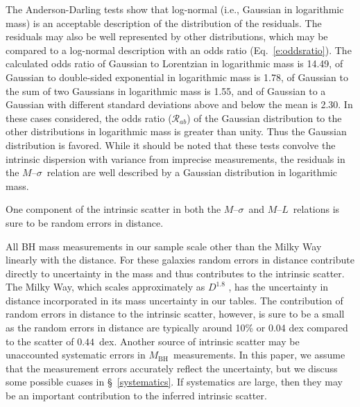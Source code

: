 \documentclass[twosided,letterpaper,numberedappendix]{emulateapj}
\newcommand{\msigma}   {\ensuremath{M}{--}\ensuremath{\sigma}}
\newcommand{\ml}       {\ensuremath{M}{--}\ensuremath{L}}
\newcommand{\mbh}      {\ensuremath{M_{\mathrm{BH}}}}
\newcommand{\msscat} {\ensuremath{0.44}}
\begin{document}
The Anderson-Darling tests show that log-normal (i.e., Gaussian in
logarithmic mass) is an acceptable description of the distribution of
the residuals.  The residuals may also be well represented by other
distributions, which may be compared to a log-normal description with
an odds ratio (Eq.~\ref{e:oddsratio}).  The calculated odds ratio of
Gaussian to Lorentzian in logarithmic mass is 14.49, of Gaussian to
double-sided exponential in logarithmic mass is 1.78, of Gaussian to
the sum of two Gaussians in logarithmic mass is 1.55, and of Gaussian
to a Gaussian with different standard deviations above and below the
mean is 2.30.  In these cases considered, the odds ratio (${\mathcal
R}_{ab}$) of the Gaussian distribution to the other distributions in
logarithmic mass is greater than unity.  Thus the Gaussian
distribution is favored.  While it should be noted that these tests
convolve the intrinsic dispersion with variance from imprecise
measurements, the residuals in the \msigma\ relation are well
described by a Gaussian distribution in logarithmic mass.

One component of the intrinsic scatter in both the \msigma\ and \ml\
relations is sure to be random errors in distance.  

All BH mass measurements in our sample scale other than the Milky Way
linearly with the distance.  For these galaxies random errors in
distance contribute directly to uncertainty in the mass and thus
contributes to the intrinsic scatter.  The Milky Way, which scales
approximately as $D^{1.8}$ \citep{ghezetal08}, has the uncertainty in
distance incorporated in its mass uncertainty in our tables.  The
contribution of random errors in distance to the intrinsic scatter,
however, is sure to be a small as the random errors in distance are
typically around 10\% or 0.04 dex \citep[e.g.,][]{tonryetal01}
compared to the scatter of \msscat~dex.
%
Another source of intrinsic scatter may be unaccounted systematic
errors in \mbh\ measurements.  In this paper, we assume that the
measurement errors accurately reflect the uncertainty, but we discuss
some possible cuases in \S~\ref{systematics}.  If systematics are
large, then they may be an important contribution to the inferred
intrinsic scatter.
\end{document}
